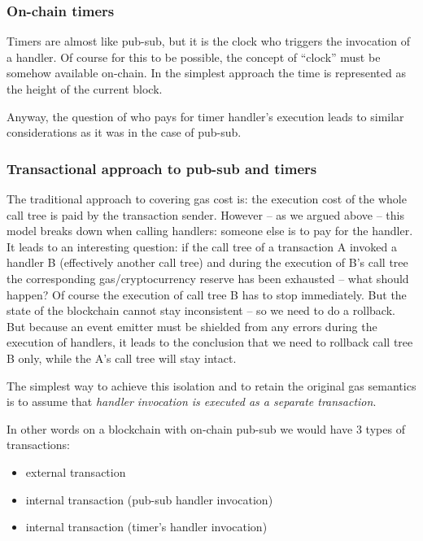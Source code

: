\documentclass[a4paper]{article}
\begin{document}
\subsubsection{On-chain timers}

Timers are almost like pub-sub, but it is the clock who triggers the invocation of a handler. Of course for this to be possible, the concept of ``clock'' must be somehow available on-chain. In the simplest approach the time is represented as the height of the current block.

Anyway, the question of who pays for timer handler’s execution leads to similar considerations as it was in the case of pub-sub.

\subsubsection{Transactional approach to pub-sub and timers}

The traditional approach to covering gas cost is: the execution cost of the whole call tree is paid by the transaction sender. However -- as we argued above -- this model breaks down when calling handlers: someone else is to pay for the handler. It leads to an interesting question: if the call tree of a transaction A invoked a handler B (effectively another call tree) and during the execution of B’s call tree the corresponding gas/cryptocurrency reserve has been exhausted -- what should happen? Of course the execution of call tree B has to stop immediately. But the state of the blockchain cannot stay inconsistent -- so we need to do a rollback. But because an event emitter must be shielded from any errors during the execution of handlers, it leads to the conclusion that we need to rollback call tree B only, while the A’s call tree will stay intact.

The simplest way to achieve this isolation and to retain the original gas semantics is to assume that \emph{handler invocation is executed as a separate transaction}.

In other words on a blockchain with on-chain pub-sub we would have 3 types of transactions:

\begin{itemize}
  \item external transaction
  \item internal transaction (pub-sub handler invocation)
  \item internal transaction (timer's handler invocation)
\end{itemize}
\end{document}
